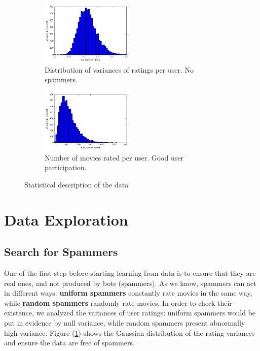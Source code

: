 \documentclass[10pt,conference,compsocconf]{IEEEtran}
\begin{document}
\begin{figure}[tbp] %
    \centering
    \hspace{-0.6cm}
    \begin{subfigure}[t]{0.45\columnwidth}
        \centering
        \includegraphics[height=1.2in]{img/Variances}
        \vspace{-3mm}
  \caption{Distribution of variances of ratings per user. No spammers.}
  \label{variances}
    \end{subfigure}%
    \hspace{0.4cm}
    \begin{subfigure}[t]{0.45\columnwidth}
        \centering
        \includegraphics[height=1.2in]{img/Ratings}
        \vspace{-3mm}
        \caption{Number of movies rated per user. Good user participation.}
        \label{number_ratings}
    \end{subfigure}
    \caption{Statistical description of the data}
\end{figure}


\section{Data Exploration}

\subsection{Search for Spammers}

One of the first step before starting learning from data is to ensure that they are real ones, and not produced by bots (spammers). As we know, spammers can act in different ways: \textbf{uniform spammers} constantly rate movies in the same way, while \textbf{random spammers} randomly rate movies. In order to check their existence, we analyzed the variances of user ratings: uniform spammers would be put in evidence by null variance, while random spammers present abnormally high variance. Figure (\ref{variances}) shows the Gaussian distribution of the rating variances and ensure the data are free of spammers.
\end{document}
